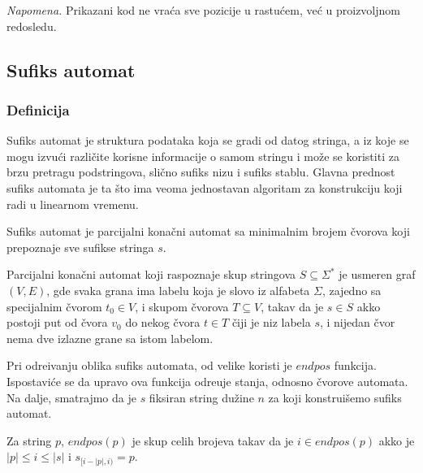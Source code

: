 \noindent
\begin{minipage}[l]{\textwidth}

\end{minipage}

\textit{Napomena.} Prikazani kod ne vra\' ca sve pozicije u rastu\' cem, ve\' c u proizvoljnom redosledu.

\subsection{Sufiks automat}

\subsubsection{Definicija}

Sufiks automat je struktura podataka koja se gradi od datog stringa, a iz koje se mogu izvu\' ci razli\v cite korisne informacije o samom stringu i mo\v ze se koristiti za brzu pretragu podstringova, sli\v cno sufiks nizu i sufiks stablu. Glavna prednost sufiks automata je ta \v sto ima veoma jednostavan algoritam za konstrukciju koji radi u linearnom vremenu.

\begin{dfn}
Sufiks automat je parcijalni kona\v cni automat sa minimalnim brojem \v cvorova koji prepoznaje sve sufikse stringa $s$.
\end{dfn}

Parcijalni kona\v cni automat koji raspoznaje skup stringova $S \subseteq \Sigma^*$ je usmeren graf $(V,E)$, gde svaka grana ima labelu koja je slovo iz alfabeta $\Sigma$, zajedno sa specijalnim \v cvorom $t_0 \in V$, i skupom \v cvorova $T \subseteq V$, takav da je $s \in S$ akko postoji put od \v cvora $v_0$ do nekog \v cvora $t \in T$ \v ciji je niz labela $s$, i nijedan \v cvor nema dve izlazne grane sa istom labelom.

Pri odre\dj ivanju oblika sufiks automata, od velike koristi je $endpos$ funkcija. Ispostavi\' ce se da upravo ova funkcija odre\dj uje stanja, odnosno \v cvorove automata. Na dalje, smatrajmo da je $s$ fiksiran string du\v zine $n$ za koji konstrui\v semo sufiks automat.

\begin{dfn}
Za string $p$, $endpos(p)$ je skup celih brojeva takav da je $i \in endpos(p)$ akko je $|p| \leq i \leq |s|$ i $s_{[i-|p|,i)} = p$.
\end{dfn}

